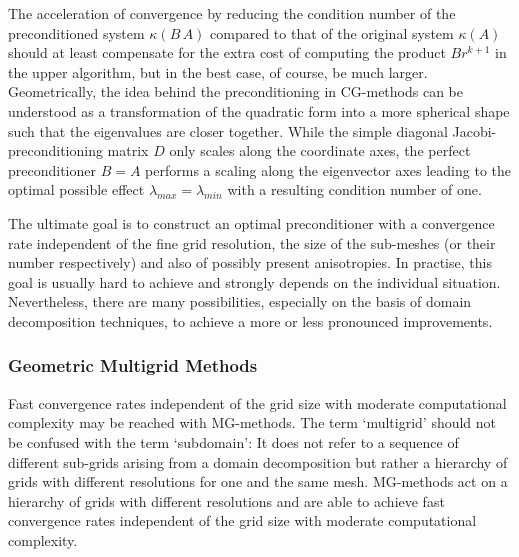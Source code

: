 The acceleration of convergence by reducing the condition number of the preconditioned system $\kappa(B \, A)$ compared to that of the original system $\kappa(A)$ should at least compensate for the extra cost of computing the product $B r^{k+1}$ in the upper algorithm, 
but in the best case, of course, be much larger. 
%
Geometrically, the idea behind the preconditioning in CG-methods can be understood as a transformation of the quadratic form into a more spherical shape such that the eigenvalues are closer together. While the simple diagonal Jacobi-preconditioning matrix $D$ only scales along the coordinate axes, the perfect preconditioner $B=A$ performs a scaling along the eigenvector axes leading to the optimal possible effect $\lambda_{max}=\lambda_{min}$ with a resulting condition number of one.



The ultimate goal is to construct an optimal
preconditioner with a convergence rate independent of the fine grid resolution, the size of the sub-meshes (or their number respectively) and also of possibly present anisotropies. In practise, this goal is usually hard to achieve and strongly depends on the individual situation. Nevertheless, there are many possibilities, especially on the basis of  domain decomposition techniques, to achieve a more or less pronounced improvements.%

\subsubsection{Geometric Multigrid Methods}
\label{SEC_SCARC_mg}

Fast convergence rates independent of the grid size with moderate computational complexity may be reached with MG-methods. The term `multigrid' should not be confused with the term `subdomain': It does not refer to a sequence of different sub-grids arising from a domain decomposition but rather a hierarchy of grids with different resolutions for one and the same mesh.
MG-methods act on a hierarchy of grids with different resolutions and are able to achieve fast convergence rates independent of the grid size with moderate computational complexity.

